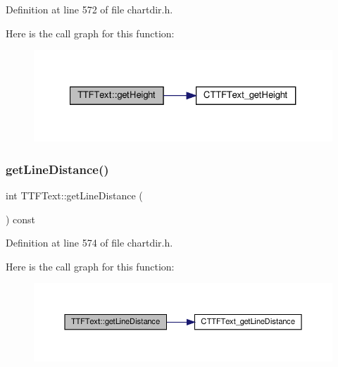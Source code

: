Definition at line 572 of file chartdir.\+h.

Here is the call graph for this function\+:
\nopagebreak
\begin{figure}[H]
\begin{center}
\leavevmode
\includegraphics[width=327pt]{class_t_t_f_text_a0b41f8472f607369f6a0eda4a6b5f84f_cgraph}
\end{center}
\end{figure}
\mbox{\label{class_t_t_f_text_a8d6ad88e723107bfa033dc699310ce1d}} 
\subsubsection{\texorpdfstring{get\+Line\+Distance()}{getLineDistance()}}
{\footnotesize\ttfamily int T\+T\+F\+Text\+::get\+Line\+Distance (\begin{DoxyParamCaption}{ }\end{DoxyParamCaption}) const\hspace{0.3cm}{\ttfamily [inline]}}



Definition at line 574 of file chartdir.\+h.

Here is the call graph for this function\+:
\nopagebreak
\begin{figure}[H]
\begin{center}
\leavevmode
\includegraphics[width=350pt]{class_t_t_f_text_a8d6ad88e723107bfa033dc699310ce1d_cgraph}
\end{center}
\end{figure}
\mbox{\label{class_t_t_f_text_a3752a7851404645f3f541cf568855f3c}} 
